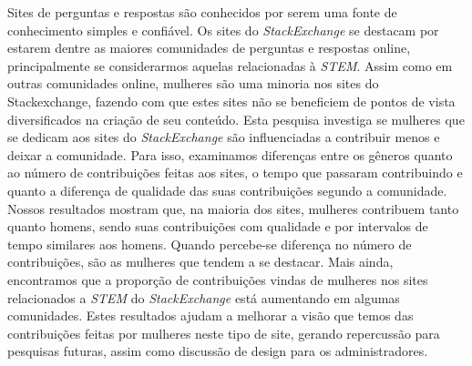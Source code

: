 Sites de perguntas e respostas são conhecidos por serem uma fonte de conhecimento simples e confiável. Os sites do \emph{StackExchange} se destacam por estarem dentre as maiores comunidades de perguntas e respostas online, principalmente se considerarmos aquelas relacionadas à \textit{STEM}. Assim como em outras comunidades online, mulheres são uma minoria nos sites do Stackexchange, fazendo com que estes sites não se beneficiem de pontos de vista diversificados na criação de seu conteúdo. Esta pesquisa investiga se mulheres que se dedicam aos sites do \emph{StackExchange} são influenciadas a contribuir menos e deixar a comunidade. Para isso, examinamos diferenças entre os gêneros quanto ao número de contribuições feitas aos sites, o tempo que passaram contribuindo e quanto a diferença de qualidade das suas contribuições segundo a comunidade. Nossos resultados mostram que, na maioria dos sites, mulheres contribuem tanto quanto homens, sendo suas contribuições com qualidade e por intervalos de tempo similares aos homens. Quando percebe-se diferença no número de contribuições, são as mulheres que tendem a se destacar. Mais ainda, encontramos que a proporção de contribuições vindas de mulheres nos sites relacionados a \emph{STEM} do \emph{StackExchange} está aumentando em algumas comunidades. Estes resultados ajudam a melhorar a visão que temos das contribuições feitas por mulheres neste tipo de site, gerando repercussão para pesquisas futuras, assim como discussão de design para os administradores.


